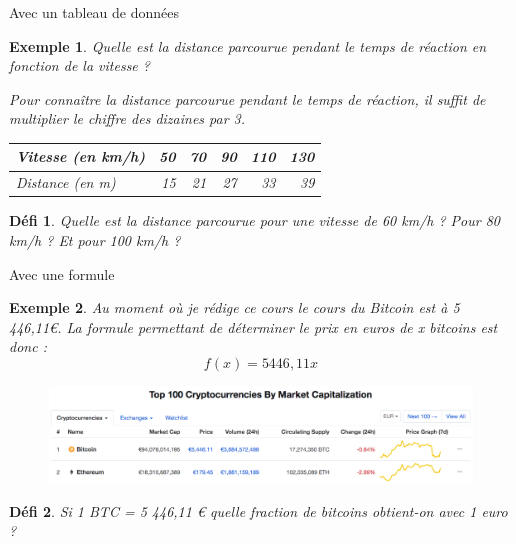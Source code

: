 \documentclass[presentation]{beamer}
\newtheorem{defi}{Défi}[section]
\newtheorem{exe}{Exemple}[section]
\begin{document}
\begin{frame}[label={sec:org3321652}]{Avec un tableau de données}
\begin{exe}
Quelle est la distance parcourue pendant le temps de réaction en
fonction de la vitesse ? 

Pour connaître la distance parcourue pendant le temps de réaction,
il suffit de multiplier le chiffre des dizaines par 3. 

\begin{center}
\begin{tabular}{l|r|r|r|r|r}
Vitesse (en km/h) & 50 & 70 & 90 & 110 & 130\\
\hline
Distance (en m) & 15 & 21 & 27 & 33 & 39\\
\end{tabular}
\end{center}
\end{exe}

\begin{defi}
Quelle est la distance parcourue pour une vitesse de 60 km/h ? Pour
80 km/h ? Et pour 100 km/h ?
\end{defi}
\end{frame}

\begin{frame}[label={sec:orgc7d3a34}]{Avec une formule}
\begin{exe}
Au moment où je rédige ce cours le cours du Bitcoin est à 5
446,11€. La formule permettant de déterminer le prix en euros de x
bitcoins est donc : \[f(x) = 5446,11x\]
\end{exe}

\begin{figure}
\begin{center}
\includegraphics[width=.95\textwidth]{coinmarket.png}
\end{center}
\end{figure}

\begin{defi}
Si 1 BTC = 5 446,11 € quelle fraction de bitcoins obtient-on avec 1
euro ?
\end{defi}
\end{frame}
\end{document}
